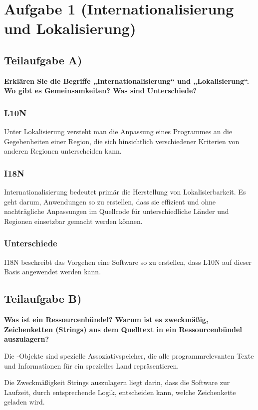 \section{Aufgabe 1 (Internationalisierung und Lokalisierung)}

\subsection{Teilaufgabe A)}
\textbf{Erklären Sie die Begriffe „Internationalisierung“ und „Lokalisierung“. Wo gibt es
Gemeinsamkeiten? Was sind Unterschiede?}

\subsubsection{L10N}
Unter Lokalisierung versteht man die Anpassung eines Programmes an die
Gegebenheiten einer Region, die sich hinsichtlich verschiedener Kriterien von
anderen Regionen unterscheiden kann.

\subsubsection{I18N}
Internationalisierung bedeutet primär die Herstellung von Lokalisierbarkeit. Es
geht darum, Anwendungen so zu erstellen, dass sie effizient und ohne
nachträgliche Anpassungen im Quellcode für unterschiedliche Länder und Regionen
einsetzbar gemacht werden können.

\subsubsection{Unterschiede}
I18N beschreibt das Vorgehen eine Software so zu erstellen, dass L10N auf dieser
Basis angewendet werden kann.

\subsection{Teilaufgabe B)}
\textbf{Was ist ein Ressourcenbündel? Warum ist es zweckmäßig, Zeichenketten (Strings) aus
dem Quelltext in ein Ressourcenbündel auszulagern?}
 
Die -Objekte sind spezielle Assoziativspeicher, die alle
programmrelevanten Texte und Informationen für ein spezielles Land
repräsentieren. 

Die Zweckmäßigkeit Strings auszulagern liegt darin, dass die Software zur
Laufzeit, durch entsprechende Logik, entscheiden kann, welche Zeichenkette
geladen wird.

